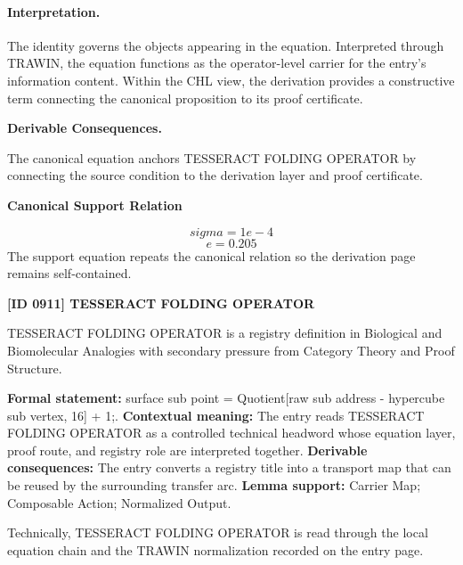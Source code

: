 \paragraph{Interpretation.}
The identity governs the objects appearing in the equation. Interpreted through TRAWIN, the equation functions as the operator-level carrier for the entry’s information content. Within the CHL view, the derivation provides a constructive term connecting the canonical proposition to its proof certificate.

\par\vspace{0.35em}
\noindent\textbf{Derivable Consequences.}\quad
\begingroup
\footnotesize
\raggedright
The canonical equation anchors TESSERACT FOLDING OPERATOR by connecting the source condition to the derivation layer and proof certificate.
\par\endgroup

\noindent\textbf{Canonical Support Relation}\par
\[
sigma = 1e-4
\]
\[
e=0.205
\]
\noindent The support equation repeats the canonical relation so the derivation page remains self-contained.\par

\clearpage
\noindent\textbf{[ID 0911] TESSERACT FOLDING OPERATOR}\par
\vspace{0.35em}
\begingroup\small
{}
TESSERACT FOLDING OPERATOR is a registry definition in Biological and Biomolecular Analogies with secondary pressure from Category Theory and Proof Structure.

\begingroup\footnotesize\setlength{\emergencystretch}{3em}\sloppy
\textbf{Formal statement:} surface sub point = Quotient[raw sub address - hypercube sub vertex, 16] + 1;. \textbf{Contextual meaning:} The entry reads TESSERACT FOLDING OPERATOR as a controlled technical headword whose equation layer, proof route, and registry role are interpreted together. \textbf{Derivable consequences:} The entry converts a registry title into a transport map that can be reused by the surrounding transfer arc. \textbf{Lemma support:} Carrier Map; Composable Action; Normalized Output.\par
\endgroup

Technically, TESSERACT FOLDING OPERATOR is read through the local equation chain and the TRAWIN normalization recorded on the entry page.

